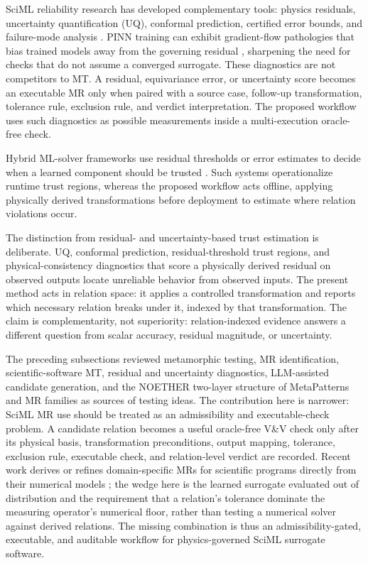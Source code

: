 \documentclass[preprint,12pt,authoryear]{elsarticle}
\begin{document}
SciML reliability research has developed complementary tools: physics residuals, uncertainty quantification (UQ), conformal prediction, certified error bounds, and failure-mode analysis \citep{raissi2019pinn,karniadakis2021piml,li2021fno,krishnapriyan2021failure,gopakumar2025calibrated}. PINN training can exhibit gradient-flow pathologies that bias trained models away from the governing residual \citep{wang2021gradflow,krishnapriyan2021failure}, sharpening the need for checks that do not assume a converged surrogate. These diagnostics are not competitors to MT. A residual, equivariance error, or uncertainty score becomes an executable MR only when paired with a source case, follow-up transformation, tolerance rule, exclusion rule, and verdict interpretation. The proposed workflow uses such diagnostics as possible measurements inside a multi-execution oracle-free check.

Hybrid ML-solver frameworks use residual thresholds or error estimates to decide when a learned component should be trusted \citep{baral2025xrepit,wang2025deeponetfe}. Such systems operationalize runtime trust regions, whereas the proposed workflow acts offline, applying physically derived transformations before deployment to estimate where relation violations occur.

The distinction from residual- and uncertainty-based trust estimation is deliberate. UQ, conformal prediction, residual-threshold trust regions, and physical-consistency diagnostics that score a physically derived residual on observed outputs \citep{najafi2026} locate unreliable behavior from observed inputs. The present method acts in relation space: it applies a controlled transformation and reports which necessary relation breaks under it, indexed by that transformation. The claim is complementarity, not superiority: relation-indexed evidence answers a different question from scalar accuracy, residual magnitude, or uncertainty.

The preceding subsections reviewed metamorphic testing, MR identification, scientific-software MT, residual and uncertainty diagnostics, LLM-assisted candidate generation, and the NOETHER two-layer structure of MetaPatterns and MR families as sources of testing ideas. The contribution here is narrower: SciML MR use should be treated as an admissibility and executable-check problem. A candidate relation becomes a useful oracle-free V\&V check only after its physical basis, transformation preconditions, output mapping, tolerance, exclusion rule, executable check, and relation-level verdict are recorded. Recent work derives or refines domain-specific MRs for scientific programs directly from their numerical models \citep{yan2024elliptic,stevens2025mars}; the wedge here is the learned surrogate evaluated out of distribution and the requirement that a relation's tolerance dominate the measuring operator's numerical floor, rather than testing a numerical solver against derived relations. The missing combination is thus an admissibility-gated, executable, and auditable workflow for physics-governed SciML surrogate software.
\end{document}
